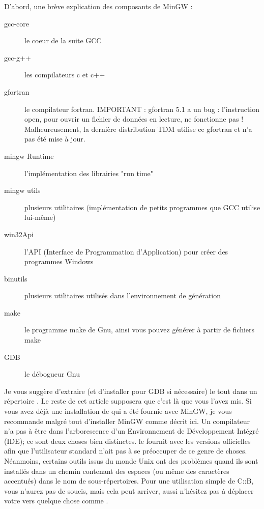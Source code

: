 
D'abord, une brève explication des composants de MinGW :

\begin{description}
\item[gcc-core] le coeur de la suite GCC
\item[gcc-g++] les compilateurs c et c++
\item[gfortran] le compilateur fortran. IMPORTANT : gfortran 5.1 a un bug : l'instruction open, pour ouvrir un fichier de données en lecture, ne fonctionne pas ! Malheureusement, la dernière distribution TDM utilise ce gfortran et n'a pas été mise à jour.
\item[mingw Runtime] l'implémentation des librairies "run time"
\item[mingw utils] plusieurs utilitaires (implémentation de petits programmes que GCC utilise lui-même)
\item[win32Api] l'API (Interface de Programmation d'Application) pour créer des programmes Windows
\item[binutils] plusieurs utilitaires utilisés dans l'environnement de génération
\item[make] le programme make de Gnu, ainsi vous pouvez générer à partir de fichiers make
\item[GDB] le débogueur Gnu
\end{description}

Je vous suggère d'extraire (et d'installer pour GDB si nécessaire) le tout dans un répertoire . Le reste de cet article supposera que c'est là que vous l'avez mis. Si vous avez déjà une installation de \codeblocks qui a été fournie avec MinGW, je vous recommande malgré tout d'installer MinGW comme décrit ici. Un compilateur n'a pas à être dans l'arborescence d'un Environnement de Développement Intégré (IDE); ce sont deux choses bien distinctes. \codeblocks le fournit avec les versions officielles afin que l'utilisateur standard n'ait pas à se préoccuper de ce genre de choses. Néanmoins, certains outils issus du monde Unix ont des problèmes quand ils sont installés dans un chemin contenant des espaces (ou même des caractères accentués) dans le nom de sous-répertoires. Pour une utilisation simple de C::B, vous n'aurez pas de soucis, mais cela peut arriver, aussi n'hésitez pas à déplacer votre  vers quelque chose comme .

